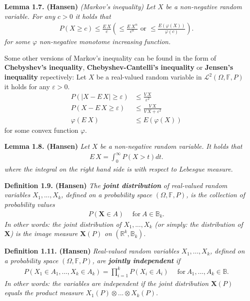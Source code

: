 \documentclass[a4paper,10pt,openany]{book}
\begin{document}
\textbf{Lemma 1.7. (Hansen)} \emph{(Markov's inequality) Let \(X\) be a non-negative random variable. For any \(c>0\) it holds that}
\begin{align*}
    P(X\ge c)\le \frac{E\, X}{c}\left(\le \frac{E\ X^n}{c^n}\text{ or }\le \frac{E\left(\varphi(X)\right)}{\varphi(c)}\right).\tag{1.14}
\end{align*}
\emph{for some \(\varphi\) non-negative monotome increasing function.}

Some other versions of Markov's inequality can be found in the form of \textbf{Chebyshev's inequality}, \textbf{Chebyshev-Cantelli's inequality} or \textbf{Jensen's inequality} repectively: Let \(X\) be a real-valued random variable in \(\mathcal{L}^2(\Omega,\mathbb{F},P)\) it holds for any \(\varepsilon>0\).
\begin{align*}
    P\left(\vert X-E\, X\vert \ge \varepsilon\right)&\le \frac{V\, X}{\varepsilon^2}\tag{1.15}\\
    P\left( X-E\, X \ge \varepsilon\right)&\le \frac{V\, X}{V\, X+\varepsilon^2}\tag{prob: 1.13(c)}\\
    \varphi\left(E\ X\right)&\le E\left( \varphi(X)\right)
\end{align*}
for some convex function \(\varphi\).

\textbf{Lemma 1.8. (Hansen)} \emph{Let \(X\) be a non-negative random variable. It holds that}
\begin{align*}
    E\, X=\int_0^\infty P(X>t)dt.\tag{1.16}
\end{align*}
\emph{where the integral on the right hand side is with respect to Lebesgue measure.}

\textbf{Definition 1.9. (Hansen)} \emph{The \textbf{joint distribution} of real-valued random variables \(X_1,...,X_k\), defined on a probability space \((\Omega, \mathbb{F},P)\), is the collection of probability values}
\begin{align*}
    P(\mathbf{X}\in A)\hspace{15pt}\text{for}\ A\in\mathbb{B}_k.\tag{1.21}
\end{align*}
\emph{In other words: the joint distribution of \(X_1,...,X_k\) (or simply: the distribution of \(\mathbf{X}\)) is the image measure \(\mathbf{X}(P)\) on \(\left(\mathbb{R}^k,\mathbb{B}_k\right)\).}

\textbf{Definition 1.11. (Hansen)} \emph{Real-valued random variables \(X_1,...,X_k\), defined on a probability space \((\Omega, \mathbb{F},P)\), are \textbf{jointly independent} if}
\begin{align*}
    P\left(X_1\in A_1,...,X_k\in A_k\right)=\prod_{i=1}^kP(X_i\in A_i)\hspace{15pt}\text{for}\ A_1,...,A_k\in\mathbb{B}.\tag{1.23}
\end{align*}
\emph{In other words: the variables are independent if the joint distribution \(\mathbf{X}(P)\) equals the product measure \(X_1(P)\otimes ... \otimes X_k(P)\).}
\end{document}
